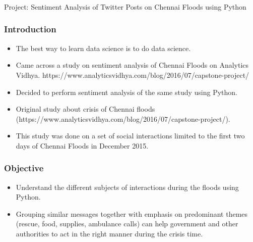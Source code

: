 \begin{frame}[fragile]\frametitle{}

\begin{center}
{\Large Project: Sentiment Analysis of Twitter Posts on Chennai Floods using Python}
\end{center}
\end{frame}

\begin{frame}[fragile]\frametitle{Introduction}
  \begin{itemize}
  \item The best way to learn data science is to do data science.
  \item Came across a study on sentiment analysis of Chennai Floods on Analytics Vidhya. https://www.analyticsvidhya.com/blog/2016/07/capstone-project/
  \item Decided to perform sentiment analysis of the same study using Python.
  \item Original study about crisis of Chennai floods (https://www.analyticsvidhya.com/blog/2016/07/capstone-project/). 
  \item This study was done on a set of social interactions limited to the first two days of Chennai Floods in December 2015.
  \end{itemize}
\end{frame}

\begin{frame}[fragile]\frametitle{Objective}
  \begin{itemize}
  \item Understand the different subjects of interactions during the floods using Python. 
  \item Grouping similar messages together with emphasis on predominant themes (rescue, food, supplies, ambulance calls) can help government and other authorities to act in the right manner during the crisis time.
  \end{itemize}
\end{frame}

